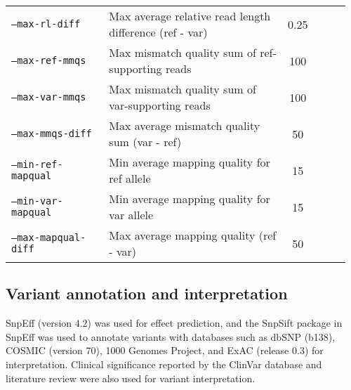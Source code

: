 \begin{table}[H]
\begin{tabular}{p{0.3\linewidth}p{0.56\linewidth}cp{0.1\linewidth}}
        \texttt{--max-rl-diff} & Max average relative read length difference (ref - var) & 0.25
        \\
        \texttt{--max-ref-mmqs} & Max mismatch quality sum of ref-supporting reads & 100
        \\
        \texttt{--max-var-mmqs} & Max mismatch quality sum of var-supporting reads & 100
        \\
        \texttt{--max-mmqs-diff} & Max average mismatch quality sum (var - ref) & 50
        \\
        \texttt{--min-ref-mapqual} & Min average mapping quality for ref allele & 15
        \\
        \texttt{--min-var-mapqual} & Min average mapping quality for var allele & 15
        \\
        \texttt{--max-mapqual-diff} & Max average mapping quality (ref - var) & 50
        \\
				\hline
      \end{tabular}
\end{table}


\subsection{Variant annotation and interpretation}

SnpEff (version 4.2) was used for effect prediction, and the SnpSift package in SnpEff was used to annotate variants with databases such as dbSNP (b138), COSMIC (version 70), 1000 Genomes Project, and \acs{ExAC} (release 0.3) for interpretation. Clinical significance reported by the ClinVar database and literature review were also used for variant interpretation.



